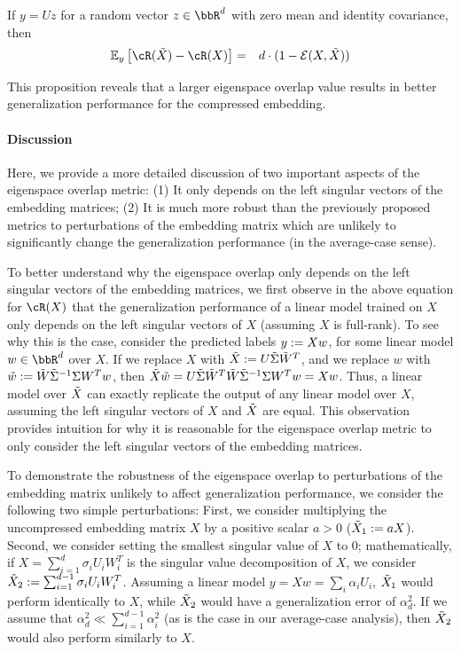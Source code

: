 \begin{proposition}
If $y = Uz$ for a random vector $z \in \RR^d$ with zero mean and identity covariance, then
\begin{eqnarray}
\expect{y}{\cR(\tX) - \cR(X)} &=& d\cdot(1 - \eigover(X,\tX))
\end{eqnarray}
\end{proposition}

This proposition reveals that a larger eigenspace overlap value results in better generalization performance for the compressed embedding.

\paragraph{Discussion}
Here, we provide a more detailed discussion of two important aspects of the eigenspace overlap metric:
(1) It only depends on the left singular vectors of the embedding matrices;
(2) It is much more robust than the previously proposed metrics to perturbations of the embedding matrix which are unlikely to significantly change the generalization performance (in the average-case sense).

To better understand why the eigenspace overlap only depends on the left singular vectors of the embedding matrices, we first observe in the above equation for $\cR(X)$ that the generalization performance of a linear model trained on $X$ only depends on the left singular vectors of $X$ (assuming $X$ is full-rank).
To see why this is the case, consider the predicted labels $y \defeq Xw$, for some linear model $w \in \RR^d$ over $X$.
If we replace $X$ with $\tX \defeq U \tSigma \tW^T$, and we replace $w$ with $\tw \defeq \tW \tSigma^{-1} \Sigma W^T w$, then $\tX \tw = U\tSigma \tW^T \tW \tSigma^{-1} \Sigma W^T w = Xw$.
Thus, a linear model over $\tX$ can exactly replicate the output of any linear model over $X$, assuming the left singular vectors of $X$ and $\tX$ are equal.
This observation provides intuition for why it is reasonable for the eigenspace overlap metric to only consider the left singular vectors of the embedding matrices.

To demonstrate the robustness of the eigenspace overlap to perturbations of the embedding matrix unlikely to affect generalization performance, we consider the following two simple perturbations:
First, we consider multiplying the uncompressed embedding matrix $X$ by a positive scalar $a > 0$ ($\tX_1 \defeq aX$).
Second, we consider setting the smallest singular value of $X$ to 0; mathematically, if $X = \sum_{i=1}^{d} \sigma_i U_i W_i^T$ is the singular value decomposition of $X$, we consider $\tX_2 \defeq \sum_{i=1}^{d-1} \sigma_i U_i W_i^T$.
Assuming a linear model $y = Xw = \sum_i \alpha_i U_i$, $\tX_1$ would perform identically to $X$, while $\tX_2$ would have a generalization error of $\alpha_d^2$.
If we assume that $\alpha_d^2 \ll \sum_{i=1}^{d-1}\alpha_i^2$ (as is the case in our average-case analysis), then $\tX_2$ would also perform similarly to $X$.

